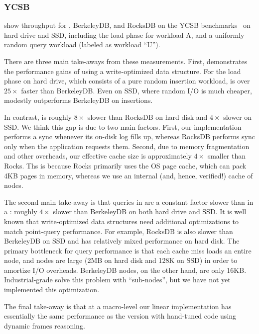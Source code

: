 \subsubsection{YCSB}

 show throughput for \name,
BerkeleyDB, and RocksDB on the YCSB benchmarks~\cite{ycsb} on hard drive and SSD,
including the load phase for workload A, and a uniformly random query
workload (labeled as workload ``U'').

There are three main take-aways from these measurements.  First, \name
demonstrates the performance gains of using a write-optimized data
structure.  For the load phase on hard drive, which consists of a pure
random insertion workload, \name is over $25\times$ faster than
BerkeleyDB.  Even on SSD, where random I/O is much cheaper, \name
modestly outperforms BerkeleyDB on insertions.

In contrast, \name is roughly $8\times$ slower than RocksDB on hard
disk and $4\times$ slower on SSD.  We think this gap is due to two main
factors.  First, our implementation performs a sync whenever its
on-disk log fills up, whereas RocksDB performs sync only when the
application requests them.  Second, due to memory fragmentation and
other overheads, our effective cache size is approximately $4\times$
smaller than Rocks.  Ths is because Rocks primarily uses the OS page
cache, which can pack 4KB pages in memory, whereas we use an internal
(and, hence, verified!) cache of nodes.

The second main take-away is that queries in \name are a constant
factor slower than in a \btree: roughly $4\times$ slower than
BerkeleyDB on both hard drive and SSD.  It is well known that
write-optimized data structures need additional optimizations to match
\btree point-query performance.  For example, RocksDB is
also slower than BerkeleyDB on SSD and has relatively mixed
performance on hard disk.  The primary bottleneck for \name query
performance is that each cache miss loads an entire node, and nodes
are large (2MB on hard disk and 128K on SSD) in order to amortize I/O
overheads.  BerkeleyDB nodes, on the other hand, are only 16KB.
Industrial-grade \beptrees solve this problem with
``sub-nodes'', but we have not yet implemented this optimization.

The final take-away is that at a macro-level our linear implementation has essentially
the same performance as the version with hand-tuned code
using dynamic frames reasoning.  

